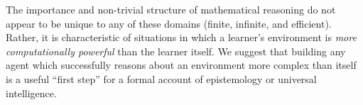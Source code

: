 \documentclass[12pt]{article}
\theoremstyle{definition}
\newcommand{\of}[1]{\left(#1\right)}
\newcommand{\vp}{\varphi}
\begin{document}
The importance and non-trivial structure of mathematical reasoning 
do not appear to be unique to
any of these domains (finite, infinite, and efficient).
Rather, it is characteristic of situations in which a learner's
environment is \emph{more computationally powerful} than the learner itself.
We suggest that building any agent which successfully reasons
about an environment more complex than itself 
is a useful ``first step'' for a formal account
of epistemology or universal intelligence.

%
%
\end{document}
